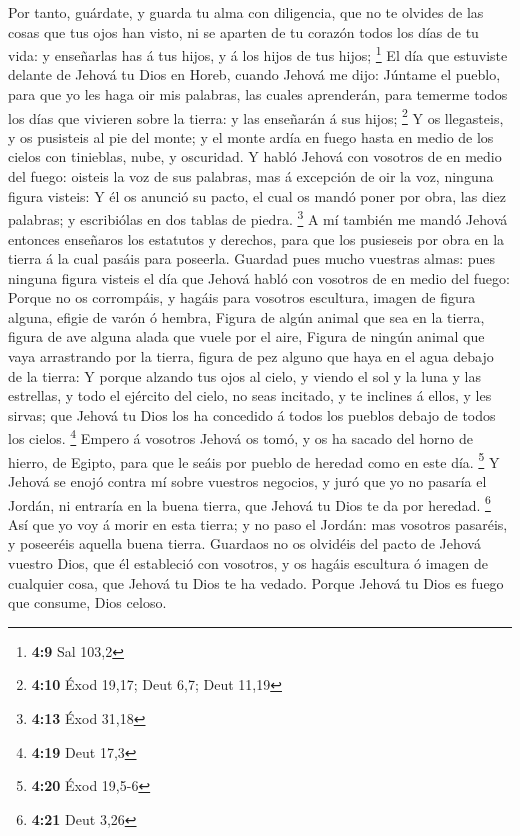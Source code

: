  Por tanto, guárdate, y guarda tu alma con diligencia, que
no te olvides de las cosas que tus ojos han visto, ni se aparten de tu
corazón todos los días de tu vida: y enseñarlas has á tus hijos, y á los
hijos de tus hijos; \footnote{\textbf{4:9} Sal 103,2}  El
día que estuviste delante de Jehová tu Dios en Horeb, cuando Jehová me
dijo: Júntame el pueblo, para que yo les haga oir mis palabras, las
cuales aprenderán, para temerme todos los días que vivieren sobre la
tierra: y las enseñarán á sus hijos; \footnote{\textbf{4:10} Éxod 19,17;
  Deut 6,7; Deut 11,19}  Y os llegasteis, y os pusisteis al
pie del monte; y el monte ardía en fuego hasta en medio de los cielos
con tinieblas, nube, y oscuridad.  Y habló Jehová con
vosotros de en medio del fuego: oisteis la voz de sus palabras, mas á
excepción de oir la voz, ninguna figura visteis:  Y él os
anunció su pacto, el cual os mandó poner por obra, las diez palabras; y
escribiólas en dos tablas de piedra. \footnote{\textbf{4:13} Éxod 31,18}
 A mí también me mandó Jehová entonces enseñaros los
estatutos y derechos, para que los pusieseis por obra en la tierra á la
cual pasáis para poseerla.  Guardad pues mucho vuestras
almas: pues ninguna figura visteis el día que Jehová habló con vosotros
de en medio del fuego:  Porque no os corrompáis, y hagáis
para vosotros escultura, imagen de figura alguna, efigie de varón ó
hembra,  Figura de algún animal que sea en la tierra,
figura de ave alguna alada que vuele por el aire,  Figura
de ningún animal que vaya arrastrando por la tierra, figura de pez
alguno que haya en el agua debajo de la tierra:  Y porque
alzando tus ojos al cielo, y viendo el sol y la luna y las estrellas, y
todo el ejército del cielo, no seas incitado, y te inclines á ellos, y
les sirvas; que Jehová tu Dios los ha concedido á todos los pueblos
debajo de todos los cielos. \footnote{\textbf{4:19} Deut 17,3}
 Empero á vosotros Jehová os tomó, y os ha sacado del horno
de hierro, de Egipto, para que le seáis por pueblo de heredad como en
este día. \footnote{\textbf{4:20} Éxod 19,5-6}  Y Jehová se
enojó contra mí sobre vuestros negocios, y juró que yo no pasaría el
Jordán, ni entraría en la buena tierra, que Jehová tu Dios te da por
heredad. \footnote{\textbf{4:21} Deut 3,26}  Así que yo voy
á morir en esta tierra; y no paso el Jordán: mas vosotros pasaréis, y
poseeréis aquella buena tierra.  Guardaos no os olvidéis
del pacto de Jehová vuestro Dios, que él estableció con vosotros, y os
hagáis escultura ó imagen de cualquier cosa, que Jehová tu Dios te ha
vedado.  Porque Jehová tu Dios es fuego que consume, Dios
celoso.


